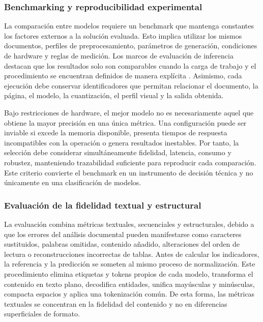 \subsubsection{Benchmarking y reproducibilidad experimental}

La comparación entre modelos requiere un benchmark que mantenga constantes los factores externos a la solución evaluada. Esto implica utilizar los mismos documentos, perfiles de preprocesamiento, parámetros de generación, condiciones de hardware y reglas de medición. Los marcos de evaluación de inferencia destacan que los resultados solo son comparables cuando la carga de trabajo y el procedimiento se encuentran definidos de manera explícita \cite{reddi2020mlperf}. Asimismo, cada ejecución debe conservar identificadores que permitan relacionar el documento, la página, el modelo, la cuantización, el perfil visual y la salida obtenida.

Bajo restricciones de hardware, el mejor modelo no es necesariamente aquel que obtiene la mayor precisión en una única métrica. Una configuración puede ser inviable si excede la memoria disponible, presenta tiempos de respuesta incompatibles con la operación o genera resultados inestables. Por tanto, la selección debe considerar simultáneamente fidelidad, latencia, consumo y robustez, manteniendo trazabilidad suficiente para reproducir cada comparación. Este criterio convierte el benchmark en un instrumento de decisión técnica y no únicamente en una clasificación de modelos.

\subsubsection{Evaluación de la fidelidad textual y estructural}

La evaluación combina métricas textuales, secuenciales y estructurales, debido a que los errores del análisis documental pueden manifestarse como caracteres sustituidos, palabras omitidas, contenido añadido, alteraciones del orden de lectura o reconstrucciones incorrectas de tablas. Antes de calcular los indicadores, la referencia y la predicción se someten al mismo proceso de normalización. Este procedimiento elimina etiquetas y tokens propios de cada modelo, transforma el contenido en texto plano, decodifica entidades, unifica mayúsculas y minúsculas, compacta espacios y aplica una tokenización común. De esta forma, las métricas textuales se concentran en la fidelidad del contenido y no en diferencias superficiales de formato.

